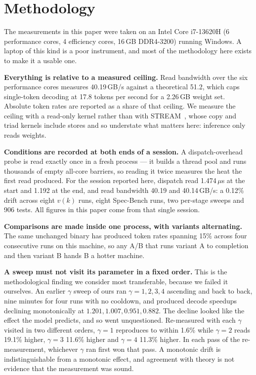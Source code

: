 \documentclass[conference]{IEEEtran}
\begin{document}
\section{Methodology}
\label{sec:method}

The measurements in this paper were taken on an Intel Core i7-13620H (6 performance cores, 4
efficiency cores, 16\,GB DDR4-3200) running Windows. A laptop of this kind is a poor instrument, and
most of the methodology here exists to make it a usable one.

\textbf{Everything is relative to a measured ceiling.} Read bandwidth over the six performance cores
measures 40.19\,GB/s against a theoretical 51.2, which caps single-token decoding at 17.8 tokens per
second for a 2.26\,GB weight set. Absolute token rates are reported as a share of that ceiling. We
measure the ceiling with a read-only kernel rather than with STREAM~\cite{mccalpin}, whose copy and
triad kernels include stores and so understate what matters here: inference only reads weights.

\textbf{Conditions are recorded at both ends of a session.} A dispatch-overhead probe is read exactly
once in a fresh process --- it builds a thread pool and runs thousands of empty all-core barriers, so
reading it twice measures the heat the first read produced. For the session reported here, dispatch
read 1.474\,$\mu$s at the start and 1.192 at the end, and read bandwidth 40.19 and 40.14\,GB/s: a
0.12\% drift across eight $v(k)$ runs, eight Spec-Bench runs, two per-stage sweeps and 906 tests. All
figures in this paper come from that single session.

\textbf{Comparisons are made inside one process, with variants alternating.} The same unchanged
binary has produced token rates spanning 15\% across four consecutive runs on this machine, so any
A/B that runs variant A to completion and then variant B hands B a hotter machine.

\textbf{A sweep must not visit its parameter in a fixed order.} This is the methodological finding we
consider most transferable, because we failed it ourselves. An earlier $\gamma$ sweep of ours ran
$\gamma = 1,2,3,4$ ascending and back to back, nine minutes for four runs with no cooldown, and
produced decode speedups declining monotonically at $1.201, 1.007, 0.951, 0.882$. The decline looked
like the effect the model predicts, and so went unquestioned. Re-measured with each $\gamma$ visited
in two different orders, $\gamma=1$ reproduces to within 1.6\% while $\gamma=2$ reads 19.1\% higher,
$\gamma=3$ 11.6\% higher and $\gamma=4$ 11.3\% higher. In each pass of the re-measurement, whichever
$\gamma$ ran first won that pass. A monotonic drift is indistinguishable from a monotonic effect, and
agreement with theory is not evidence that the measurement was sound.
\end{document}
